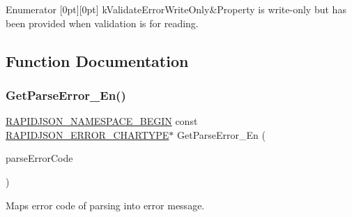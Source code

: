 \begin{DoxyEnumFields}{Enumerator}
[0pt][0pt]{}\mbox{\label{group__RAPIDJSON__ERRORS_gga2e1f88f94a5d9a6817a5de0ed2f0105aa794b9acc44a5e37d3f9881806849f844}} 
k\+Validate\+Error\+Write\+Only&Property is write-\/only but has been provided when validation is for reading. \\
\hline

\end{DoxyEnumFields}


\subsection{Function Documentation}
\mbox{\label{group__RAPIDJSON__ERRORS_ga755b523205f46c980c80d12e230a3abd}} 
\subsubsection{\texorpdfstring{Get\+Parse\+Error\+\_\+\+En()}{GetParseError\_En()}}
{\footnotesize\ttfamily \hyperlink{group__RAPIDJSON__CONFIG_gad3806c8251fdc7da9618b7e922674ffc}{R\+A\+P\+I\+D\+J\+S\+O\+N\+\_\+\+N\+A\+M\+E\+S\+P\+A\+C\+E\+\_\+\+B\+E\+G\+IN} const \hyperlink{group__RAPIDJSON__ERRORS_ga7e4636fd48d0148f102b8a13f0539d8c}{R\+A\+P\+I\+D\+J\+S\+O\+N\+\_\+\+E\+R\+R\+O\+R\+\_\+\+C\+H\+A\+R\+T\+Y\+PE}$\ast$ Get\+Parse\+Error\+\_\+\+En (\begin{DoxyParamCaption}\item[{\hyperlink{group__RAPIDJSON__ERRORS_ga8d4b32dfc45840bca189ade2bbcb6ba7}{Parse\+Error\+Code}}]{parse\+Error\+Code }\end{DoxyParamCaption})\hspace{0.3cm}{\ttfamily [inline]}}



Maps error code of parsing into error message. 


